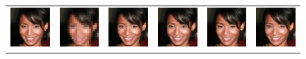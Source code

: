 \begin{figure}[ht]
\begin{center}
\begin{tabular}{cccccc}
        \includegraphics[width=.15\textwidth]{Chapter2/samples/super-resolution/table/2/x.png} &   
        \includegraphics[width=.15\textwidth]{Chapter2/samples/super-resolution/table/2/y.png} &
        \includegraphics[width=.15\textwidth]{Chapter2/samples/super-resolution/table/2/hcflow.png} &
        \includegraphics[width=.15\textwidth]{Chapter2/samples/super-resolution/table/2/sr3.png} & 
        \includegraphics[width=.15\textwidth]{Chapter2/samples/super-resolution/table/2/Song.png} &
        \includegraphics[width=.15\textwidth]{Chapter2/samples/super-resolution/table/2/DV.png} \\
        

\end{tabular}
\end{center}
\end{figure}
